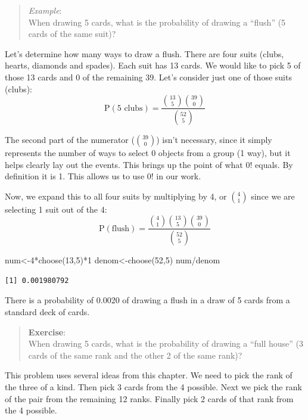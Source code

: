 \documentclass[
  letterpaper,
  DIV=11,
  numbers=noendperiod]{scrreprt}
\newenvironment{Shaded}{\begin{snugshade}}{\end{snugshade}}
\newcommand{\DecValTok}[1]{\textcolor[rgb]{0.68,0.00,0.00}{#1}}
\newcommand{\FunctionTok}[1]{\textcolor[rgb]{0.28,0.35,0.67}{#1}}
\newcommand{\NormalTok}[1]{\textcolor[rgb]{0.00,0.23,0.31}{#1}}
\newcommand{\OtherTok}[1]{\textcolor[rgb]{0.00,0.23,0.31}{#1}}
\newcommand{\SpecialCharTok}[1]{\textcolor[rgb]{0.37,0.37,0.37}{#1}}
\begin{document}
\begin{quote}
\emph{Example}:\\
When drawing 5 cards, what is the probability of drawing a ``flush'' (5
cards of the same suit)?
\end{quote}

Let's determine how many ways to draw a flush. There are four suits
(clubs, hearts, diamonds and spades). Each suit has 13 cards. We would
like to pick 5 of those 13 cards and 0 of the remaining 39. Let's
consider just one of those suits (clubs): \[
\mbox{P}(\mbox{5 clubs})=\frac{\binom{13}{5}\binom{39}{0}}{\binom{52}{5}}
\]

The second part of the numerator (\(\binom{39}{0}\)) isn't necessary,
since it simply represents the number of ways to select 0 objects from a
group (1 way), but it helps clearly lay out the events. This brings up
the point of what \(0!\) equals. By definition it is 1. This allows us
to use \(0!\) in our work.

Now, we expand this to all four suits by multiplying by 4, or
\(\binom{4}{1}\) since we are selecting 1 suit out of the 4: \[
\mbox{P}(\mbox{flush})=\frac{\binom{4}{1}\binom{13}{5}\binom{39}{0}}{\binom{52}{5}}
\]

\begin{Shaded}
\begin{Highlighting}[]
\NormalTok{num}\OtherTok{\textless{}{-}}\DecValTok{4}\SpecialCharTok{*}\FunctionTok{choose}\NormalTok{(}\DecValTok{13}\NormalTok{,}\DecValTok{5}\NormalTok{)}\SpecialCharTok{*}\DecValTok{1}
\NormalTok{denom}\OtherTok{\textless{}{-}}\FunctionTok{choose}\NormalTok{(}\DecValTok{52}\NormalTok{,}\DecValTok{5}\NormalTok{)}
\NormalTok{num}\SpecialCharTok{/}\NormalTok{denom}
\end{Highlighting}
\end{Shaded}

\begin{verbatim}
[1] 0.001980792
\end{verbatim}

There is a probability of 0.0020 of drawing a flush in a draw of 5 cards
from a standard deck of cards.

\begin{quote}
\textbf{Exercise}:\\
When drawing 5 cards, what is the probability of drawing a ``full
house'' (3 cards of the same rank and the other 2 of the same rank)?
\end{quote}

This problem uses several ideas from this chapter. We need to pick the
rank of the three of a kind. Then pick 3 cards from the 4 possible. Next
we pick the rank of the pair from the remaining 12 ranks. Finally pick 2
cards of that rank from the 4 possible.
\end{document}
